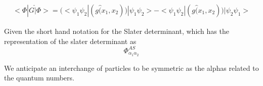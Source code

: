 \documentclass[11pt]{article} %
\begin{document}
\begin{equation}
\begin{split}
<\Phi|G\hat|\Phi>=(<\psi_1 \psi_2|(g\hat(x_1,x_2))|\psi_1\psi_2>-<\psi_1\psi_2|(g\hat(x_1,x_2))|\psi_2\psi_1>
\end{split}
\end{equation}

Given the short hand notation for the Slater determinant, which has the representation of the slater determinant as\\

\begin{equation}
\Phi_{\alpha_1 \alpha_2}^{AS}
\end{equation}

We anticipate an interchange of particles to be symmetric as the alphas related to the quantum numbers. 
\end{document}
